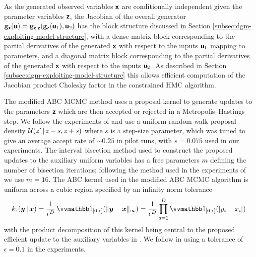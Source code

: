 As the generated observed variables $\boldsymbol{\mathsf{x}}$ are conditionally independent given the parameter variables $\boldsymbol{\mathsf{z}}$, the Jacobian of the overall generator ${\mathbf{g}}_{\boldsymbol{\mathsf{x}}}(\boldsymbol{\mathsf{u}}) = {\mathbf{g}}_{\boldsymbol{\mathsf{x}}|\boldsymbol{\mathsf{z}}}({\mathbf{g}}_{\boldsymbol{\mathsf{z}}}(\boldsymbol{\mathsf{u}}_1),\boldsymbol{\mathsf{u}}_2)$ has the block structure discussed in Section \ref{subsec:dgm-exploiting-model-structure}, with a dense matrix block corresponding to the partial derivatives of the generated $\boldsymbol{\mathsf{x}}$ with respect to the inputs $\boldsymbol{\mathsf{u}}_1$ mapping to parameters, and a diagonal matrix block corresponding to the partial derivatives of the generated $\boldsymbol{\mathsf{x}}$ with respect to the inputs $\boldsymbol{\mathsf{u}}_2$. As described in Section \ref{subsec:dgm-exploiting-model-structure} this allows efficient computation of the Jacobian product Cholesky factor in the constrained \ac{HMC} algorithm.

The modified \ac{ABC} \ac{MCMC} method uses a proposal kernel to generate updates to the parameters $\boldsymbol{\mathsf{z}}$ which are then accepted or rejected in a Metropolis--Hastings step. We follow the experiments of \citep{mcvinish2012improving} and use a uniform random-walk proposal density $\mathcal{U}(z' \operatorname{|} z - s, z +s)$ where $s$ is a step-size parameter, which was tuned to give an average accept rate of $\sim 0.25$ in pilot runs, with $s = 0.075$ used in our experiments. The interval bisection method used to construct the proposed updates to the auxiliary uniform variables has a free parameters $m$ defining the number of bisection iterations; following the method used in the experiments of \citep{mcvinish2012improving} we use $m = 16$. The \ac{ABC} kernel used in the modified \ac{ABC} \ac{MCMC} algorithm is uniform across a cubic region specified by an infinity norm tolerance
\begin{equation}
  k_{\epsilon}(\vct{y} \gvn \vct{x}) = \frac{1}{\epsilon^D} \ind{[0,\epsilon]}\lpa \Vert \vct{y} - \vct{x} \Vert_{\infty}\rpa = \frac{1}{\epsilon^D} \prod_{d=1}^D \ind{[0,\epsilon]}(|y_i - x_i|)
\end{equation}
with the product decomposition of this kernel being central to the proposed efficient update to the auxiliary variables in \citep{mcvinish2012improving}. We follow \citep{mcvinish2012improving} in using a tolerance of $\epsilon = 0.1$ in the experiments.

